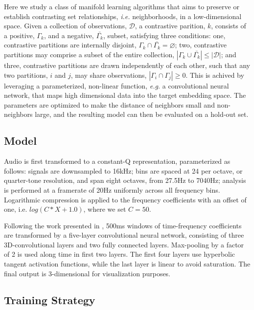 \documentclass{article}
\begin{document}
Here we study a class of manifold learning algorithms that aims to preserve or establish contrasting set relationships, \emph{i.e.} neighborhoods, in a low-dimensional space.
Given a collection of observations, $\mathcal{D}$, a contrastive parition, $k$, consists of a positive, $\Gamma_k$, and a negative, $\bar{\Gamma_k}$, subset, satisfying three conditions:
one, contrastive partitions are internally disjoint, $\Gamma_k \cap \bar{\Gamma_k} = \varnothing$;
two, contrastive partitions may comprise a subset of the entire collection, $|\Gamma_k \cup \bar{\Gamma_k}| \le |\mathcal{D}|$;
and three, contrastive partitions are drawn independently of each other, such that any two partitions, $i$ and $j$, may share observations, $|\Gamma_i \cap \Gamma_j| \ge 0$.
This is achived by leveraging a parameterized, non-linear function, \emph{e.g.} a convolutional neural network, that maps high dimensional data into the target embedding space.
The parameters are optimized to make the distance of neighbors small and non-neighbors large, and the resulting model can then be evaluated on a hold-out set.


\subsection{Model}

Audio is first transformed to a constant-Q representation, parameterized as follows:
signals are downsampled to 16kHz;
bins are spaced at 24 per octave, or quarter-tone resolution, and span eight octaves, from 27.5Hz to 7040Hz;
analysis is performed at a framerate of 20Hz uniformly across all frequency bins.
Logarithmic compression is applied to the frequency coefficients with an offset of one, i.e. $log(C*X + 1.0)$, where we set $C=50$.

Following the work presented in \cite{humphrey2015dl4mir}, 500ms windows of time-frequency coefficients are transformed by a five-layer convolutional neural network, consisting of three 3D-convolutional layers and two fully connected layers.
Max-pooling by a factor of 2 is used along time in first two layers.
The first four layers use hyperbolic tangent activation functions, while the last layer is linear to avoid saturation.
The final output is 3-dimensional for visualization purposes.


\subsection{Training Strategy}
\end{document}
